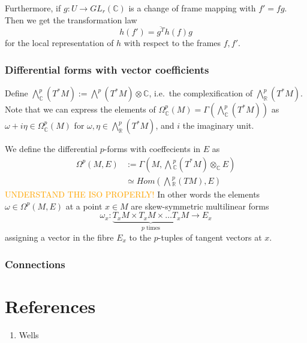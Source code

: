 \documentclass[a4paper]{article}
\theoremstyle{definition} \newtheorem*{definition}{Definition}
\theoremstyle{definition} \newtheorem*{definitions}{Definitions}
\theoremstyle{plain} \newtheorem{theorem}{Theorem}[section]
\theoremstyle{plain} \newtheorem{proposition}[theorem]{Proposition}
\theoremstyle{plain} \newtheorem{corollary}[theorem]{Corollary}
\theoremstyle{plain} \newtheorem{lemma}[theorem]{Lemma}
\theoremstyle{plain} \newtheorem{example}[theorem]{Example}
\newcommand{\understandBetter}[1]{\textcolor{orange}{#1}}
\newcommand{\realnos}{\mathbb{R}}
\newcommand{\complexnos}{\mathbb{C}}
\begin{document}
Furthermore, if $g:U\to GL_r(\complexnos)$ is a change of frame mapping with $f'=fg$. Then we get the transformation law
$$h(f')=\overline{g^T}h(f)g$$
for the local representation of $h$ with respect to the frames $f, f'$.

\subsubsection{Differential forms with vector coefficients}
Define $\bigwedge^p_\complexnos(T^\ast M):=\bigwedge^p (T^\ast M)\otimes \complexnos$, i.e.\ the complexification of $\bigwedge^p_\realnos(T^\ast M)$. Note that we can express the elements of $\Omega^p_\complexnos(M)=\Gamma(\bigwedge^p_\complexnos(T^\ast M))$ as $\omega+i\eta \in \Omega^p_\complexnos(M)$ for $\omega, \eta \in \bigwedge^p_\realnos(T^\ast M)$, and $i$ the imaginary unit. 

We define the differential $p$-forms with coeffecients in $E$ as 
\begin{align*}
\Omega^p(M, E) & :=\Gamma(M, \bigwedge {}^p_\complexnos(T^\ast M) \otimes_\complexnos E) \\
& \simeq Hom(\bigwedge {}^p_\realnos (TM), E)
\end{align*}
\understandBetter{UNDERSTAND THE ISO PROPERLY!}
In other words the elements $\omega\in \Omega^p(M, E)$ at a point $x\in M$ are skew-symmetric multilinear forms 
$$\omega_x:\underbrace{T_xM\times T_xM\times \ldots T_xM}_{p \text{ times}} \to E_x$$
assigning a vector in the fibre $E_x$ to the $p$-tuples of tangent vectors at $x$. 

\subsubsection{Connections}

\section*{References}
\begin{enumerate}
\item Wells
\end{enumerate}
\end{document}
